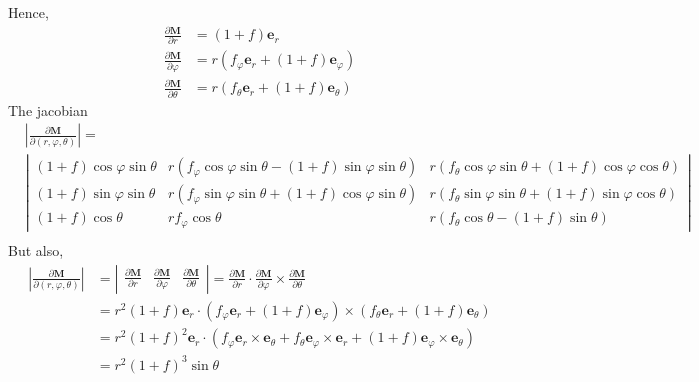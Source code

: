 Hence, 
\begin{align}
    \frac{\partial \textbf{M}}{\partial r}
    &=
    (1+f)\textbf{e}_r
    \\
    \frac{\partial \textbf{M}}{\partial \varphi}
    &=
    r(f_\varphi \textbf{e}_r
    + (1 + f) \textbf{e}_{\varphi})
    \\
    \frac{\partial \textbf{M}}{\partial \theta}
    &=
    r(f_\theta \textbf{e}_r
    + (1 + f) \textbf{e}_{\theta})
\end{align}
The jacobian
\begin{align*}
    &|\frac{\partial \textbf{M}}{\partial (r,\varphi,\theta)}| =\\ 
    &\left|
    \begin{matrix}
        (1+f)\cos\varphi \sin\theta&
        r(f_\varphi \cos\varphi \sin\theta - (1 + f)\sin \varphi \sin\theta)&
        r(f_\theta  \cos\varphi \sin\theta + (1 + f)  \cos\varphi \cos\theta)\\
        (1+f)\sin\varphi \sin\theta&
        r(f_\varphi \sin\varphi \sin\theta + (1 + f) \cos \varphi \sin\theta)&
        r(f_\theta  \sin\varphi \sin\theta + (1 + f)  \sin\varphi \cos\theta)\\
        (1+f)\cos\theta&
        rf_\varphi \cos\theta &
        r(f_\theta \cos\theta - (1 + f)  \sin\theta)
    \end{matrix}
    \right|\\
\end{align*}
But also, 
\begin{align*}
    |\frac{\partial \textbf{M}}{\partial (r,\varphi,\theta)}|
    &=
    \left|
    \begin{matrix}
        \frac{\partial \textbf{M}}{\partial r}
        &\frac{\partial \textbf{M}}{\partial \varphi}
        &\frac{\partial \textbf{M}}{\partial \theta}
    \end{matrix}\right|
    =
    \frac{\partial \textbf{M}}{\partial r}
    \cdot
    \frac{\partial \textbf{M}}{\partial \varphi}
    \times 
    \frac{\partial \textbf{M}}{\partial \theta}\\
    &=
    r^2 (1+f)\textbf{e}_r\cdot
        (f_\varphi \textbf{e}_r + (1+f)\textbf{e}_\varphi)
        \times (f_\theta \textbf{e}_r + (1+f)\textbf{e}_\theta)\\
    &=
    r^2 (1+f)^2\textbf{e}_r\cdot
        ( f_\varphi \textbf{e}_r\times \textbf{e}_\theta + f_\theta \textbf{e}_\varphi \times  \textbf{e}_r  + (1+f)\textbf{e}_\varphi \times \textbf{e}_\theta)\\
        &= r^2 (1+f)^3 \sin\theta
\end{align*}

